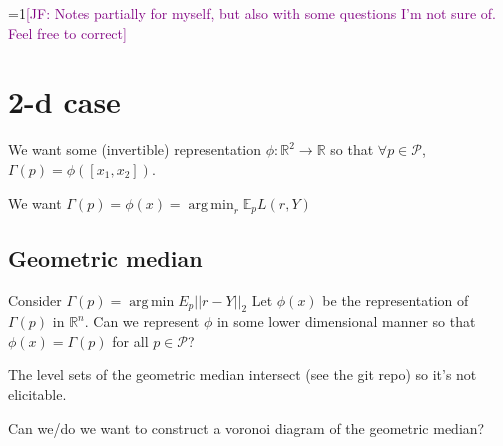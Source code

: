 \documentclass[12pt]{article}
\newcommand{\Comments}{0}
\newcommand{\mynote}[2]{\ifnum\Comments=1\textcolor{#1}{#2}\fi}
\newcommand{\jessie}[1]{\mynote{purple}{[JF: #1]}}
\newcommand{\reals}{\mathbb{R}}
\newcommand{\E}{\mathbb{E}}
\renewcommand{\P}{\mathcal{P}}
\renewcommand{\P}{\mathcal{P}}
\DeclareMathOperator*{\argmin}{arg\,min}
\begin{document}
\jessie{Notes partially for myself, but also with some questions I'm not sure of.  Feel free to correct}
\section{2-d case}
We want some (invertible) representation $\phi: \reals^2 \to \reals$ so that $\forall p \in \P$, $\Gamma(p) = \phi([ x_1, x_2 ])$.

We want $\Gamma(p) = \phi(x) = \argmin_r \E_p L(r, Y)$

\subsection{Geometric median}
Consider $\Gamma(p) = \argmin E_p ||r - Y ||_2$
Let $\phi(x)$ be the representation of $\Gamma(p)$ in $\reals^n$.
Can we represent $\phi$ in some lower dimensional manner so that $\phi(x) = \Gamma(p)$ for all $p \in \P$?

The level sets of the geometric median intersect (see the git repo) so it's not elicitable.

Can we/do we want to construct a voronoi diagram of the geometric median?
\end{document}
